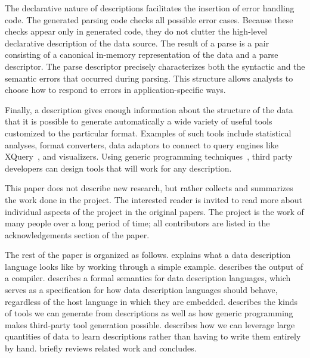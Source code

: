 \documentclass{sig-alternate}
\begin{document}
The declarative nature of \pads{} descriptions facilitates the
insertion of error handling code.  The generated parsing code checks
all possible error cases.  Because these checks appear only in
generated code, they do not clutter the high-level declarative
description of the data source.  The result of a parse is a pair
consisting of a canonical in-memory representation of the data and a
parse descriptor. The parse descriptor precisely characterizes both
the syntactic and the semantic errors that occurred during parsing.
This structure allows analysts to choose how to respond to errors in
application-specific ways.

Finally, a \pads{} description gives enough information about the
structure of the data that it is possible to generate automatically a
wide variety of useful tools customized to the particular format.
Examples of such tools include statistical analyses, format
converters, data adaptors to connect to query engines like
XQuery~\cite{fernandez+:padx}, and visualizers.  Using generic
programming techniques~\cite{mandelbaum+:pads-ml,fernandez+:padl,Lammel+:syb},
third party developers can design tools that will work for any \pads{}
description.



This paper does not describe new research, but rather collects and
summarizes the work done in the \pads{} project. The interested reader
is invited to read more about individual aspects of the project in the
original papers.  The project is the work of many people over a long
period of time; all contributors are listed in the acknowledgements
section of the paper.

The rest of the paper is organized as follows. 
explains what a \pads{} data description language looks like by
working through a simple example.  describes the
output of a \pads{} compiler.   describes a formal
semantics for data description languages, which serves as a
specification for how \pads{} data description languages should
behave, regardless of the host language in which they are embedded.
 describes the kinds of tools we can generate from
\pads{} descriptions as well as how generic programming makes third-party
tool generation possible.   describes how we can
leverage large quantities of data to learn \pads{} descriptions rather
than having to write them entirely by hand.   briefly
reviews related work and 
concludes.
\end{document}
